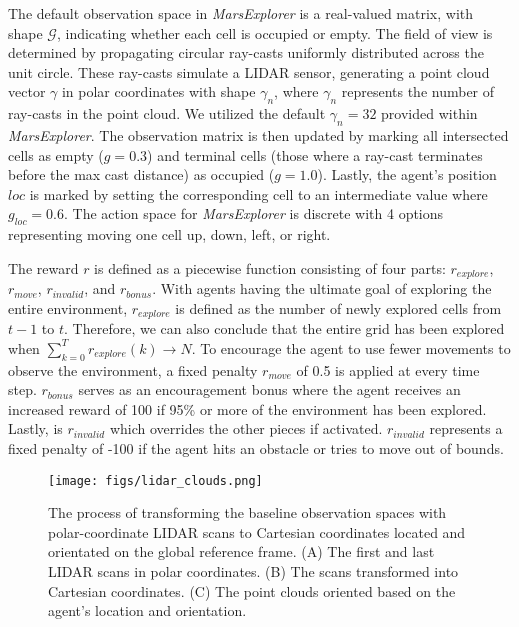The default observation space in \textit{MarsExplorer} is a real-valued matrix, with shape $\mathcal{G}$, indicating whether each cell is occupied or empty. The field of view is determined by propagating circular ray-casts uniformly distributed across the unit circle. These ray-casts simulate a LIDAR sensor, generating a point cloud vector $\gamma$ in polar coordinates with shape $\gamma_n$, where $\gamma_n$ represents the number of ray-casts in the point cloud. We utilized the default $\gamma_n=32$ provided within \textit{MarsExplorer}. The observation matrix is then updated by marking all intersected cells as empty ($g=0.3$) and terminal cells (those where a ray-cast terminates before the max cast distance) as occupied ($g=1.0$). Lastly, the agent's position $loc$ is marked by setting the corresponding cell to an intermediate value where $g_{loc}=0.6$. The action space for \textit{MarsExplorer} is discrete with 4 options representing moving one cell up, down, left, or right.

The reward $r$ is defined as a piecewise function consisting of four parts: $r_{explore}$, $r_{move}$, $r_{invalid}$, and $r_{bonus}$. With agents having the ultimate goal of exploring the entire environment, $r_{explore}$ is defined as the number of newly explored cells from $t-1$ to $t$. Therefore, we can also conclude that the entire grid has been explored when $\sum_{k=0}^Tr_{explore}(k) \rightarrow N$. To encourage the agent to use fewer movements to observe the environment, a fixed penalty $r_{move}$ of 0.5 is applied at every time step. $r_{bonus}$ serves as an encouragement bonus where the agent receives an increased reward of 100 if 95\% or more of the environment has been explored. Lastly, is $r_{invalid}$ which overrides the other pieces if activated. $r_{invalid}$ represents a fixed penalty of -100 if the agent hits an obstacle or tries to move out of bounds.

\begin{figure*}
    \centering
    \texttt{[image: figs/lidar\_clouds.png]}
    \caption{The process of transforming the baseline observation spaces with polar-coordinate LIDAR scans to Cartesian coordinates located and orientated on the global reference frame. (A) The first and last LIDAR scans in polar coordinates. (B) The scans transformed into Cartesian coordinates. (C) The point clouds oriented based on the agent's location and orientation.}
    \label{fig:data-transformation}
\end{figure*}

